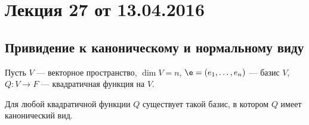 


\renewcommand{\f}{\mathbb{f}}

\section{Лекция 27 от 13.04.2016}

\subsection*{Привидение к каноническому и нормальному виду}

Пусть $V$ --- векторное пространство, $\dim V = n$, $\e = \vector{e}$ --- базис $V$, $Q \colon V \rightarrow F$ --- квадратичная функция на $V$.

\begin{Theorem}
Для любой квадратичной функции $Q$ существует такой базис, в котором $Q$ имеет канонический вид.
\end{Theorem}


